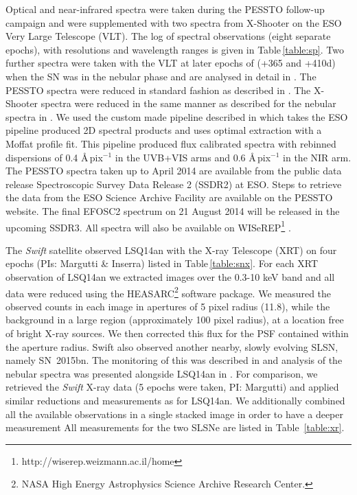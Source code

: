 \documentclass[useAMS,usenatbib]{mn2e}
\def\an{LSQ14an}
\begin{document}
Optical and near-infrared spectra were taken during the PESSTO follow-up campaign and 
were supplemented with two spectra from X-Shooter on the ESO Very Large Telescope (VLT). 
The log of spectral observations (eight separate epochs), with resolutions and wavelength ranges is given in Table\,\ref{table:sp}. Two further spectra were taken with the VLT at later epochs of (+365 and +410d) when the SN was in the nebular 
phase and are analysed in detail in \cite{je16}. The PESSTO spectra were reduced
in standard fashion as described in \cite{2015A&A...579A..40S}. 
The X-Shooter spectra were reduced in the same manner as described for the nebular 
spectra in \citet{je16}. We used the custom made pipeline described in \citet{2015A&A...581A.125K} which takes the ESO pipeline produced 2D spectral products 
\citep[][]{2010SPIE.7737E..28M} and uses  optimal extraction with a Moffat profile fit.  This pipeline produced flux calibrated spectra with rebinned dispersions of 0.4 \AA\,pix$^{-1}$ in the UVB+VIS arms and  0.6 \AA\,pix$^{-1}$ in the NIR arm. 
The PESSTO spectra taken up to April 2014 are available from the public data release
Spectroscopic Survey Data Release 2 (SSDR2) at ESO. Steps to retrieve the data 
from the ESO Science Archive Facility are available on the PESSTO website. The final 
EFOSC2 spectrum on 21 August 2014 will be released in the upcoming SSDR3. All spectra
will also be available on WISeREP\footnote{http://wiserep.weizmann.ac.il/home} \citep{2012PASP..124..668Y}. 

The {\it Swift} satellite observed LSQ14an with the X-ray Telescope (XRT) on four epochs (PIs: Margutti \& Inserra)
listed in Table\,\ref{table:snx}.  For each XRT observation of \an\/ we extracted images over the 0.3-10 keV band and all data were reduced using the HEASARC\footnote{NASA High Energy Astrophysics Science Archive Research Center.} software package. 
  We measured the observed counts in each image in apertures of 5 pixel radius (11.8\arcsec), while the background in a large region (approximately 100 pixel radius), at a location free of bright X-ray sources. We then corrected this flux for the PSF contained within the aperture radius.  Swift also observed another nearby, slowly evolving SLSN, namely SN~2015bn. The monitoring of this was described in 
\cite{ni16a,ni16b} and analysis of the nebular spectra was presented alongside LSQ14an in \citet{je16}. For comparison, we retrieved the {\it Swift} X-ray data (5 epochs were taken, PI: Margutti) and applied similar reductions and measurements as for LSQ14an. 
We additionally combined all the available observations in a single stacked image in order to have a deeper measurement
All measurements for the two SLSNe are listed in Table~\ref{table:xr}. 
\end{document}
